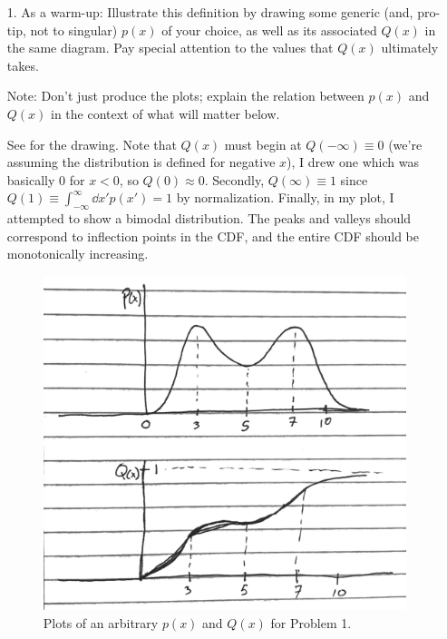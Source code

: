 \documentclass[a4paper,twoside]{article}
\begin{document}
\begin{itemize}
    \item[1.] As a warm-up: Illustrate this definition by drawing some generic (and, pro-tip, not to singular) $ p(x) $ of your choice, as well as its associated $ Q(x) $ in the same diagram. Pay special attention to the values that $ Q(x) $ ultimately takes.

        Note: Don't just produce the plots; explain the relation between $ p(x) $ and $ Q(x) $ in the context of what will matter below.
        \begin{problem}
            See  for the drawing. Note that $ Q(x) $ must begin at $ Q(- \infty) \equiv 0 $ (we're assuming the distribution is defined for negative $ x $), I drew one which was basically $ 0 $ for $ x < 0 $, so $ Q(0) \approx 0 $. Secondly, $ Q(\infty) \equiv 1 $ since $ Q(1) \equiv \int_{- \infty}^{\infty} \dd{x'} p(x') = 1 $ by normalization. Finally, in my plot, I attempted to show a bimodal distribution. The peaks and valleys should correspond to inflection points in the CDF, and the entire CDF should be monotonically increasing.
        \end{problem}
        \begin{figure}[h]
            \centering
            \includegraphics[width=\textwidth]{Midterm_Problem_1.png}
            \caption{Plots of an arbitrary $ p(x) $ and $ Q(x) $ for Problem 1.}
            \label{fig:problem_1_plot}

\end{figure}
\end{itemize}
\end{document}
